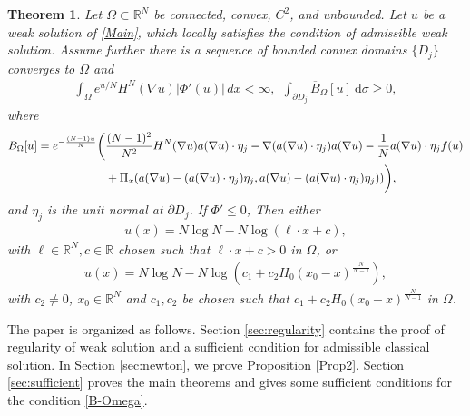 \documentclass[10pt,a4paper]{amsart}
\numberwithin{equation}{section}
\newtheorem{thm}{Theorem}[section]
\newtheorem{cor}[thm]{Corollary}
\newcommand{\pa}{\partial}
\newcommand{\R}{\mathbb{R}}
\newcommand{\e}{\textup{e}}
\newcommand{\RRC}{\operatorname{RRC}}
\begin{document}
\begin{thm}\label{thm:unbounded}
Let $\Omega\subset\mathbb R^N$ be connected, convex, $C^2$, and unbounded. Let $u$ be a weak solution of
\eqref{Main}, which locally satisfies the condition of admissible weak solution. Assume further  there is a sequence of bounded convex domains $\{D_j\}$ converges to $\Omega$ and
\begin{align}\label{unbounded-assumption}
    \int_\Omega e^{u/N}H^N(\nabla u)|\Phi'(u)|\,dx<\infty, \ \ \int_{\pa D_j} \overline{B}_{\Omega}[u] \ \text{d} \sigma \geq 0,
\end{align}
where
\begin{align}\label{eq:overlineBOmega}
    B_{\Omega}[u] = \e^{-\frac{(N-1)u}{N}} \bigg( & \frac{(N-1)^2}{N^2} H^N(\nabla u) a(\nabla u) \cdot \eta_j - \nabla (a(\nabla u) \cdot \eta_j) a(\nabla u )  - \frac{1}{N} a(\nabla u) \cdot \eta_j f(u) \nonumber \\
    & + \Pi_x(a(\nabla u) - (a(\nabla u) \cdot  \eta_j) \eta_j, a(\nabla u) - (a(\nabla u) \cdot  \eta_j) \eta_j)) \bigg),
\end{align}
and $\eta_j$ is the unit normal at $\pa D_j$. If $\Phi'\le0$, Then either
    \begin{align}\label{linear-log+}
        u(x) = N \log N - N \log (\ell \cdot x + c),
    \end{align}
    with $\ell \in \R^N, c \in \R$ chosen such that $\ell \cdot x + c > 0 $ in $\Omega$, or
    \begin{align}\label{bubble-log+}
        u(x) = N \log N - N \log (c_1 + c_2 H_0( x_0 -x )^{\frac{N}{N-1}}),
    \end{align}
    with $c_2 \neq 0$, $x_0 \in \R^N$ and $c_1, c_2$ be chosen such that $c_1 + c_2 H_0(x_0-x)^{\frac{N}{N-1}} $ in $\Omega$.
\end{thm}




The paper is organized as follows. Section \ref{sec:regularity} contains the proof of regularity of weak solution and a sufficient condition for admissible classical solution. In Section \ref{sec:newton}, we prove Proposition \ref{Prop2}. Section \ref{sec:sufficient} proves the main theorems and gives some sufficient conditions for the condition \eqref{B-Omega}.
\end{document}
